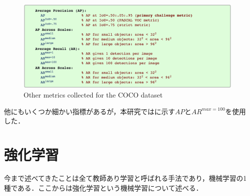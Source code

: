 \begin{figure}[H]
    \centering
    \includegraphics[width=\linewidth]{figure/chapter2/cocoAP}
    \caption[Other metrics collected for the COCO dataset.]{Other metrics collected for the COCO dataset\cite{COCO}}
    \label{fig:COCOAP}
\end{figure}

他にもいくつか細かい指標があるが，本研究ではに示す$AP$と$AR^{max=100}$を使用した．

\section{強化学習}\label{sec:強化学習}
今まで述べてきたことは全て教師あり学習と呼ばれる手法であり，機械学習の1種である．ここからは強化学習という機械学習について述べる．

